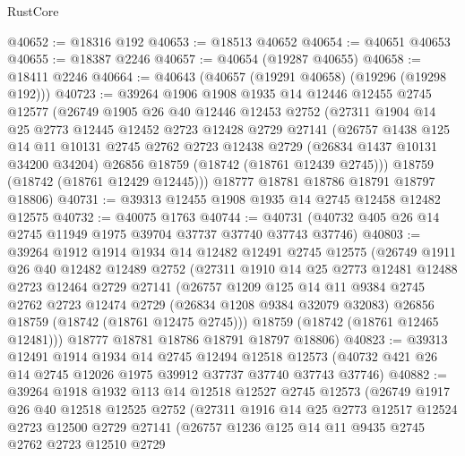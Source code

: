\begin{lexlean}{RustCore}
\begin{coremodule}
@40652 := @18316 @192
@40653 := @18513 @40652
@40654 := @40651 @40653
@40655 := @18387 @2246
@40657 := @40654 (@19287 @40655)
@40658 := @18411 @2246
@40664 := @40643 (@40657 (@19291 @40658) (@19296 (@19298 @192)))
@40723 := @39264
    @1906
    @1908
    @1935
    @14
    @12446
    @12455
    @2745
    @12577
    (@26749
      @1905
      @26
      @40
      @12446
      @12453
      @2752
      (@27311
        @1904
        @14
        @25
        @2773
        @12445
        @12452
        @2723
        @12428
        @2729
        @27141
        (@26757
          @1438
          @125
          @14
          @11
          @10131
          @2745
          @2762
          @2723
          @12438
          @2729
          (@26834 @1437 @10131 @34200 @34204)
          @26856
          @18759
          (@18742 (@18761 @12439 @2745)))
        @18759
        (@18742 (@18761 @12429 @12445)))
      @18777
      @18781
      @18786
      @18791
      @18797
      @18806)
@40731 := @39313 @12455 @1908 @1935 @14 @2745 @12458 @12482 @12575
@40732 := @40075 @1763
@40744 := @40731 (@40732 @405 @26 @14 @2745 @11949 @1975 @39704 @37737 @37740 @37743 @37746)
@40803 := @39264
    @1912
    @1914
    @1934
    @14
    @12482
    @12491
    @2745
    @12575
    (@26749
      @1911
      @26
      @40
      @12482
      @12489
      @2752
      (@27311
        @1910
        @14
        @25
        @2773
        @12481
        @12488
        @2723
        @12464
        @2729
        @27141
        (@26757
          @1209
          @125
          @14
          @11
          @9384
          @2745
          @2762
          @2723
          @12474
          @2729
          (@26834 @1208 @9384 @32079 @32083)
          @26856
          @18759
          (@18742 (@18761 @12475 @2745)))
        @18759
        (@18742 (@18761 @12465 @12481)))
      @18777
      @18781
      @18786
      @18791
      @18797
      @18806)
@40823 := @39313
    @12491
    @1914
    @1934
    @14
    @2745
    @12494
    @12518
    @12573
    (@40732 @421 @26 @14 @2745 @12026 @1975 @39912 @37737 @37740 @37743 @37746)
@40882 := @39264
    @1918
    @1932
    @113
    @14
    @12518
    @12527
    @2745
    @12573
    (@26749
      @1917
      @26
      @40
      @12518
      @12525
      @2752
      (@27311
        @1916
        @14
        @25
        @2773
        @12517
        @12524
        @2723
        @12500
        @2729
        @27141
        (@26757
          @1236
          @125
          @14
          @11
          @9435
          @2745
          @2762
          @2723
          @12510
          @2729

\end{coremodule}
\end{lexlean}
